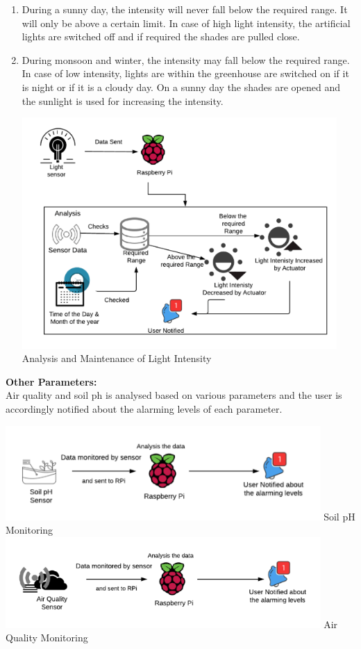 \documentclass[12pt]{extarticle}
\begin{document}
\begin{enumerate}[label=\alph*]
\begin{enumerate}[label=\arabic*]
                    \item
                    During a sunny day, the intensity will never fall below the required range. It will only be above a certain limit. In case of high light intensity, the artificial lights are switched off and if required the shades are pulled close.
                    \item
                    During monsoon and winter, the intensity may fall below the required range. In case of low intensity, lights are within the greenhouse are switched on if it is night or if it is a cloudy day. On a sunny day the shades are opened and the sunlight is used for increasing the intensity.
                    \begin{center}                        \includegraphics[width=12cm]{LightIntensity.png}
                        Analysis and Maintenance of Light Intensity\\
                    \end{center}
                \end{enumerate}
            \textbf{Other Parameters:}\\
            Air quality and soil ph is analysed based on various parameters and the user is accordingly notified about the alarming levels of each parameter.
            \begin{center}
                \includegraphics[width=12cm]{SoilpH.png}
                Soil pH Monitoring
                \includegraphics[width=12cm]{AirQuality.png}
                Air Quality Monitoring
            \end{center}
    \end{enumerate}
\end{document}
